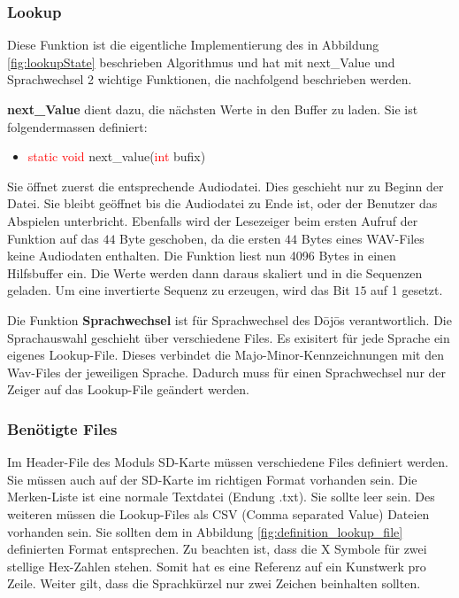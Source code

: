 \subsubsection{Lookup}
Diese Funktion ist die eigentliche Implementierung des in Abbildung \ref{fig:lookupState} beschrieben Algorithmus und hat mit next\_Value und Sprachwechsel 2 wichtige Funktionen, die nachfolgend beschrieben werden.

\textbf{next\_Value} dient dazu, die nächsten Werte in den Buffer zu laden. Sie ist folgendermassen definiert:
\begin{itemize}
	\item [] \textcolor{red}{static void} next\_value(\textcolor{red}{int} bufix)
\end{itemize}
Sie öffnet zuerst die entsprechende Audiodatei. Dies geschieht nur zu Beginn der Datei. Sie bleibt geöffnet bis die Audiodatei zu Ende ist, oder der Benutzer das Abspielen unterbricht. Ebenfalls wird der Lesezeiger beim ersten Aufruf der Funktion auf das $44$ Byte geschoben, da die ersten $44$ Bytes eines WAV-Files keine Audiodaten enthalten. Die Funktion liest nun 4096 Bytes in einen Hilfsbuffer ein. Die Werte werden dann daraus skaliert und in die Sequenzen geladen. Um eine invertierte Sequenz zu erzeugen, wird das Bit $15$ auf 1 gesetzt.


Die Funktion \textbf{Sprachwechsel} ist für Sprachwechsel des Dōjōs verantwortlich. Die Sprachauswahl geschieht über verschiedene Files. Es exisitert für jede Sprache ein eigenes Lookup-File. Dieses verbindet die Majo-Minor-Kennzeichnungen mit den Wav-Files der jeweiligen Sprache. Dadurch muss für einen Sprachwechsel nur der Zeiger auf das Lookup-File geändert werden.

\subsubsection{Benötigte Files}
Im Header-File des Moduls SD-Karte müssen verschiedene Files definiert werden. Sie müssen auch auf der SD-Karte im richtigen Format vorhanden sein. Die Merken-Liste ist eine normale Textdatei (Endung .txt). Sie sollte leer sein. Des weiteren müssen die Lookup-Files als CSV (Comma separated Value) Dateien vorhanden sein. Sie sollten dem in Abbildung \ref{fig:definition_lookup_file} definierten Format entsprechen. Zu beachten ist, dass die X Symbole für zwei stellige Hex-Zahlen stehen. Somit hat es eine Referenz auf ein Kunstwerk pro Zeile. Weiter gilt, dass die Sprachkürzel nur zwei Zeichen beinhalten sollten.

